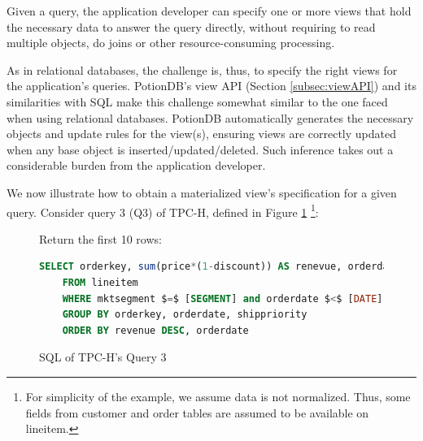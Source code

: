 \documentclass[sigconf, nonacm]{acmart}
\begin{document}
Given a query, the application developer can specify one or more views that hold the necessary data to answer the query directly, without requiring to read multiple objects, do joins or other resource-consuming processing.

As in relational databases, the challenge is, thus, to specify the right views for the application's queries.
PotionDB's view API (Section \ref{subsec:viewAPI}) and its similarities with SQL make this challenge somewhat similar to the one faced when using relational databases.
PotionDB automatically generates the necessary objects and update rules for the view(s), ensuring views are correctly updated when any base object is inserted/updated/deleted.
Such inference takes out a considerable burden from the application developer.

We now illustrate how to obtain a materialized view’s specification for a given query. 
Consider query 3 (Q3) of TPC-H, defined in Figure \ref{fig:q3}
\footnote{For simplicity of the example, we assume data is not normalized. Thus, some fields from customer and order tables are assumed to be available on lineitem.}:

\begin{figure}[h]
	Return the first 10 rows: \\
	\begin{lstlisting}[language=SQL]
	SELECT orderkey, sum(price*(1-discount)) AS renevue, orderdate, shippriority
	FROM lineitem
	WHERE mktsegment $=$ [SEGMENT] and orderdate $<$ [DATE] and shipdate $>$ [DATE]
	GROUP BY orderkey, orderdate, shippriority
	ORDER BY revenue DESC, orderdate
	\end{lstlisting}
\caption{SQL of TPC-H's Query 3}
\label{fig:q3}
\end{figure}

\end{document}
